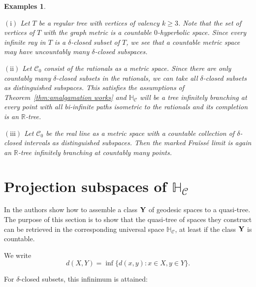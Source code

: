 \documentclass{amsart}
\renewcommand{\d}{\delta}
\renewcommand{\H}{\mathbb{H}}
\newcommand{\C}{\mathcal{C}}
\newtheorem{examples}[defi]{Examples}
\begin{document}
\begin{examples}\label{ex: dense set}

$\mathrm{(i)}$  Let $T$ be a regular tree with vertices of valency $k\geq 3$. Note that the set of vertices of $T$ with the graph metric is a countable $0$-hyperbolic space. Since every infinite ray in $T$ is a  $\d$-closed subset of $T$, we see that a countable metric space may have uncountably many  $\d$-closed subspaces.

$\mathrm{(ii)}$ Let $\C_0$ consist of the rationals as a metric space. Since there are only countably many  $\d$-closed subsets in the rationals, we can take all  $\d$-closed subsets as distinguished subspaces. This satisfies the assumptions of Theorem~\ref{thm:amalgamation works} and $\H_\C$ will be a tree infinitely branching at every point with all bi-infinite paths isometric to the rationals and its completion is an $\mathbb{R}$-tree.


$\mathrm{(iii)}$  Let $\C_0$ be the real line as a metric space with a countable collection  of  $\d$-closed  intervals as distinguished subspaces. Then the marked Fra\"iss\'e limit is again an $\mathbb{R}$-tree infinitely branching at countably many points.
\end{examples}


\section{Projection subspaces of $\H_\C$}\label{sec:projection}


In \cite{Bestvina} the authors show how to assemble a class $\bf{Y}$ of geodesic spaces to a quasi-tree. The purpose of this section is to show that the quasi-tree of spaces they construct can be retrieved in the corresponding universal space $\H_\C$, at least if the class $\bf{Y}$ is countable.

We write
\[d(X,Y)=\inf\{d(x,y)\colon x\in X, y\in Y\}.\] 

For   $\d$-closed subsets, this infinimum is attained: 
\end{document}
